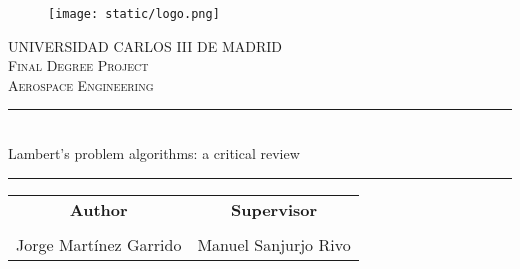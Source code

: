 \begin{titlepage}

  \begin{center}

    \begin{figure}[h]
      \centering
      \texttt{[image: static/logo.png]}
    \end{figure}
    \vspace{1cm}

    \textsc{\Large
      UNIVERSIDAD CARLOS III DE MADRID
    }\\[1cm]

    \textsc{\Large
      Final Degree Project
    }\\[0.25cm]
    \textsc{\Large
      Aerospace Engineering
    }\\[1.5cm]

    \noindent\rule{\textwidth}{1pt}
    \\[0.25cm]
    {
    \fontsize{35pt}{35pt}\selectfont
    {
      Lambert's problem algorithms: a critical review
    }
    }
    \noindent\rule{\textwidth}{1pt}

    \vspace{1.5cm}

    \begin{table}[ht]
      \centering
      \begin{tabular}{cc}
        {\ul \Large \textbf{Author}}   & {\ul \Large \textbf{Supervisor}} \\
        \multicolumn{1}{l}{}           & \multicolumn{1}{l}{}             \\
        \large{Jorge Martínez Garrido} & \large{Manuel Sanjurjo Rivo}
      \end{tabular}
    \end{table}

  \end{center}
\end{titlepage}
